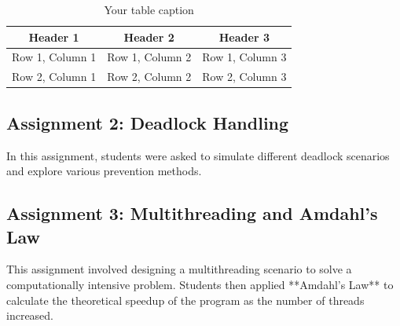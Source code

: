 \documentclass[12pt]{article}
\begin{document}
\begin{table}[htbp] %
    \centering
    \begin{tabular}{|c|c|c|} %
    \hline
    Header 1 & Header 2 & Header 3 \\ %
    \hline
    Row 1, Column 1 & Row 1, Column 2 & Row 1, Column 3 \\ %
    \hline
    Row 2, Column 1 & Row 2, Column 2 & Row 2, Column 3 \\ %
    \hline
    \end{tabular}
    \caption{Your table caption} %
    \label{tab:your_label} %
\end{table}
\subsection{Assignment 2: Deadlock Handling}
In this assignment, students were asked to simulate different deadlock scenarios and explore various prevention methods.

\subsection{Assignment 3: Multithreading and Amdahl's Law}
This assignment involved designing a multithreading scenario to solve a computationally intensive problem. Students then applied **Amdahl's Law** to calculate the theoretical speedup of the program as the number of threads increased.
\end{document}
